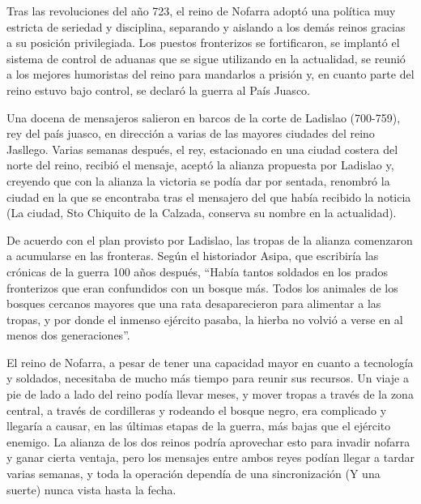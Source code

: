 Tras las revoluciones del año 723, el reino de Nofarra adoptó una política muy estricta de seriedad y disciplina, separando y aislando a los demás reinos gracias a su posición privilegiada. Los puestos fronterizos se fortificaron, se implantó el sistema de control de aduanas que se sigue utilizando en la actualidad, se reunió a los mejores humoristas del reino para mandarlos a prisión y, en cuanto parte del reino estuvo bajo control, se declaró la guerra al País Juasco. 
\par
Una docena de mensajeros salieron en barcos de la corte de Ladislao (700-759), rey del país juasco, en dirección a varias de las mayores ciudades del reino Jasllego. Varias semanas después, el rey, estacionado en una ciudad costera del norte del reino, recibió el mensaje, aceptó la alianza propuesta por Ladislao y, creyendo que con la alianza la victoria se podía dar por sentada, renombró la ciudad en la que se encontraba tras el mensajero del que había recibido la noticia (La ciudad, Sto Chiquito de la Calzada, conserva su nombre en la actualidad).
\par 
De acuerdo con el plan provisto por Ladislao, las tropas de la alianza comenzaron a acumularse en las fronteras. Según el historiador Asipa, que escribiría las crónicas de la guerra 100 años después, ``Había tantos soldados en los prados fronterizos que eran confundidos con un bosque más. Todos los animales de los bosques cercanos mayores que una rata desaparecieron para alimentar a las tropas, y por donde el inmenso ejército pasaba, la hierba no volvió a verse en al menos dos generaciones''. 
\par 
El reino de Nofarra, a pesar de tener una capacidad mayor en cuanto a tecnología y soldados, necesitaba de mucho más tiempo para reunir sus recursos. Un viaje a pie de lado a lado del reino podía llevar meses, y mover tropas a través de la zona central, a través de cordilleras y rodeando el bosque negro, era complicado y llegaría a causar, en las últimas etapas de la guerra, más bajas que el ejército enemigo. La alianza de los dos reinos podría aprovechar esto para invadir nofarra y ganar cierta ventaja, pero los mensajes entre ambos reyes podían llegar a tardar varias semanas, y toda la operación dependía de una sincronización (Y una suerte) nunca vista hasta la fecha.
\par 
